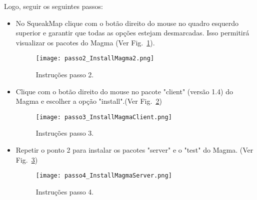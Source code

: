 Logo, seguir os seguintes passos:
\begin{itemize}
\item{No SqueakMap clique com o botão direito do mouse no quadro esquerdo superior e garantir que todas as opções estejam desmarcadas. Isso permitirá visualizar os pacotes do Magma (Ver Fig.~\ref{fig:passo2_InstallMagma2}).}

\begin{figure}[!htb]
\centering
\texttt{[image: passo2\_InstallMagma2.png]}
\caption{Instruções passo 2.}
\label{fig:passo2_InstallMagma2}
\end{figure}


\item{Clique com o botão direito do mouse no pacote "client" (versão 1.4) do Magma e escolher a opção "install".(Ver Fig.~\ref{fig:passo3_InstallMagmaClient})}

\begin{figure}[!htb]
\centering
\texttt{[image: passo3\_InstallMagmaClient.png]}
\caption{Instruções passo 3.}
\label{fig:passo3_InstallMagmaClient}
\end{figure}


\item{Repetir o ponto 2 para instalar os pacotes  "server" e o "test" do Magma. (Ver Fig.~\ref{fig:passo4_InstallMagmaServer})}

\begin{figure}[!htb]
\centering
\texttt{[image: passo4\_InstallMagmaServer.png]}
\caption{Instruções passo 4.}
\label{fig:passo4_InstallMagmaServer}
\end{figure}

\end{itemize}



